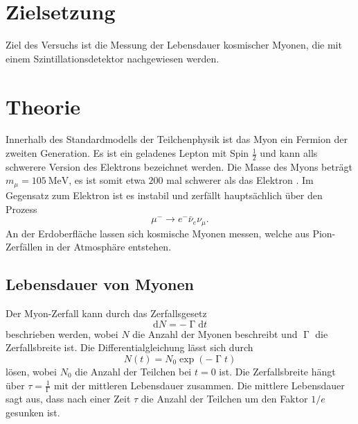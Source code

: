 \section{Zielsetzung}
Ziel des Versuchs ist die Messung der Lebensdauer kosmischer Myonen, die mit einem Szintillationsdetektor
nachgewiesen werden.
\section{Theorie}
Innerhalb des Standardmodells der Teilchenphysik ist das Myon ein Fermion der zweiten Generation. Es ist ein geladenes Lepton mit Spin $\frac{1}{2}$  und kann alls schwerere Version des Elektrons bezeichnet werden.
Die Masse des Myons beträgt $m_{\mu} = \SI{105}{\MeV}$, es ist somit etwa $200$ mal schwerer als das Elektron \cite{pdg}.
Im Gegensatz zum Elektron ist es instabil und zerfällt hauptsächlich über den Prozess
\begin{equation*}
    \mu^- \rightarrow e^- \bar \nu_e \nu_{\mu}.
\end{equation*}
An der Erdoberfläche lassen sich kosmische Myonen messen, welche aus Pion-Zerfällen in der Atmosphäre entstehen.
\subsection{Lebensdauer von Myonen}
Der Myon-Zerfall kann durch das Zerfallsgesetz 
\begin{equation*}
    \mathrm{d} N = -\upGamma \mathrm{d}t
\end{equation*}
beschrieben werden, wobei $N $ die Anzahl der Myonen beschreibt und $\upGamma$ die Zerfallsbreite ist.
Die Differentialgleichung lässt sich durch 
\begin{equation}
    \label{eqn:Zerfall}
    N(t) = N_0 \exp \left(-\upGamma t \right)
\end{equation}
lösen, wobei $N_0$ die Anzahl der Teilchen bei $t = 0$ ist. Die Zerfallsbreite hängt über  $ \tau = \frac{1}{\upGamma}$ mit der mittleren Lebensdauer zusammen. 
Die mittlere Lebensdauer sagt aus, dass nach einer Zeit $\tau$ die Anzahl der Teilchen um den Faktor $1/e$ gesunken ist.